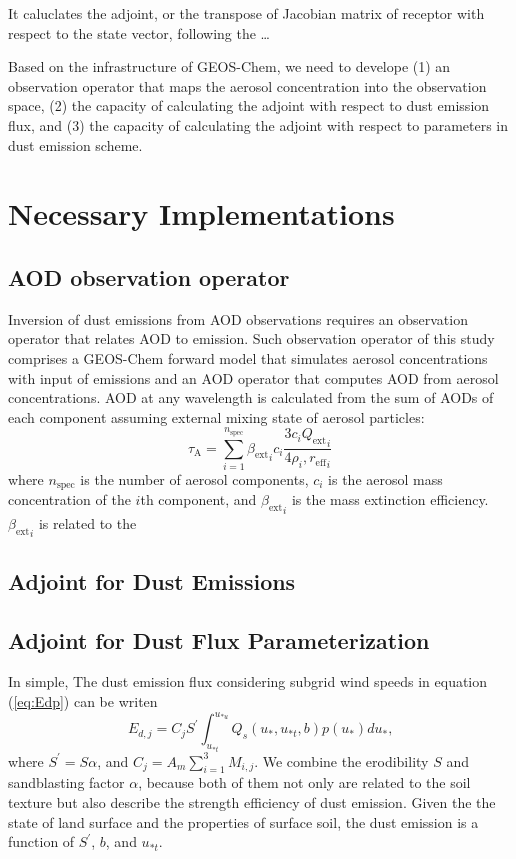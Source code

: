  It caluclates the adjoint, or the transpose of Jacobian matrix of receptor with respect 
 to the state vector, following the \ldots

 Based on the infrastructure of GEOS-Chem, we need to develope (1) an observation operator 
 that maps the aerosol concentration into the observation space, (2) the capacity of 
 calculating the adjoint with respect to dust emission flux, and (3) the capacity of 
 calculating the adjoint with respect to parameters in dust emission scheme. 

\section{Necessary Implementations}

 \subsection{AOD observation operator}

  Inversion of dust emissions from AOD observations requires 
  an observation operator that relates AOD to emission. 
  Such observation operator of this study comprises 
  a GEOS-Chem forward model that simulates aerosol concentrations 
  with input of emissions and an AOD operator that computes AOD 
  from aerosol concentrations. 
  AOD at any wavelength is calculated from the sum of AODs 
  of each component assuming external mixing state of aerosol
  particles:
  \begin{equation} \label{eq:aod} 
   \tau_\text{A} = \displaystyle \sum_{i=1}^{n_\text{spec}} 
                   {\beta_\text{ext}}_i c_i
                   \frac{3c_i {Q_\text{ext}}_i}{4 \rho_i, {r_\text{eff}}_i}
  \end{equation}
  where $n_\text{spec}$ is the number of aerosol components, 
  $c_i$ is the aerosol mass concentration of the $i$th component, 
  and ${\beta_\text{ext}}_i$ is the mass extinction efficiency. 
  ${\beta_\text{ext}}_i$ is related to the 

 
 \subsection{Adjoint for Dust Emissions}
 \subsection{Adjoint for Dust Flux Parameterization}

   In simple, The dust emission flux considering subgrid wind speeds in equation 
   (\ref{eq:Edp}) can be writen
   \begin{equation}
   E_{d,j} = C_j S^\prime \int^{u_{*u}}_{u_{*t}} Q_s(u_*,u_{*t},b) p(u_*) d u_* \mbox{,}
   \end{equation}
   where $S^\prime = S \alpha$, and $C_j=A_m \displaystyle \sum_{i=1}^3 M_{i,j}$. We combine
   the erodibility $S$ and sandblasting factor $\alpha$, because both of them not only are 
   related to the soil texture but also describe the strength efficiency of dust emission. 
   Given the the state of land surface and the properties of surface soil, the dust emission
   is a function of $S^\prime$, $b$, and $u_{*t}$. 

